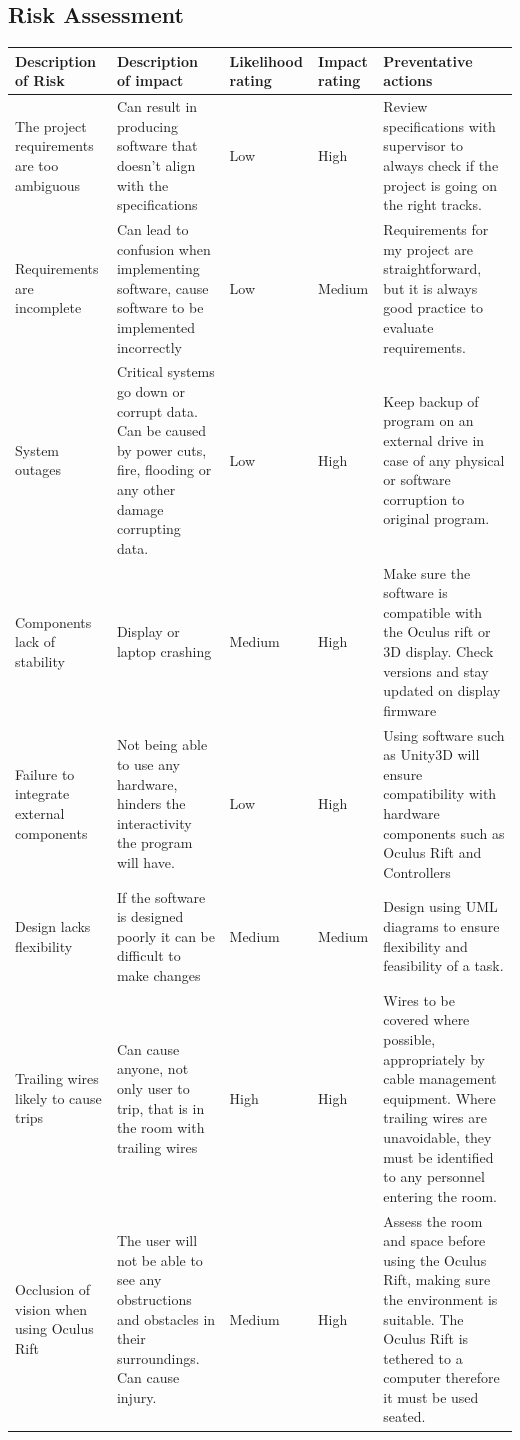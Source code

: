 \documentclass[12pt]{article} %
\begin{document}
\begin{flushleft}
\subsection{Risk Assessment}
\begin{supertabular}{ p{2.5cm}>{\arraybackslash}p{3.75cm} p{1.75cm} p{1.75cm} p{5cm} }
\hline
Description of Risk & Description of impact  & Likelihood rating & Impact rating & Preventative actions  \\ \midrule
The project requirements are too ambiguous & Can result in producing software that doesn’t align with the specifications & Low & High & Review specifications with supervisor to always check if the project is going on the right tracks.\\ \midrule
Requirements are incomplete & Can lead to confusion when implementing software, cause software to be implemented incorrectly  & Low & Medium & Requirements for my project are straightforward, but it is always good practice to evaluate requirements. \\  \midrule
System outages & Critical systems go down or corrupt data. Can be caused by power cuts, fire, flooding or any other damage corrupting data.& Low & High & Keep backup of program on an external drive in case of any physical or software corruption to original program. \\ \midrule
Components lack of stability & Display or laptop crashing & Medium & High & Make sure the software is compatible with the Oculus rift or 3D display. Check versions and stay updated on display firmware \\ \midrule
Failure to integrate external components & Not being able to use any hardware, hinders the interactivity the program will have. & Low & High & Using software such as Unity3D will ensure compatibility with hardware components such as Oculus Rift and Controllers \\  \midrule
Design lacks flexibility & If the software is designed poorly it can be difficult to make changes & Medium & Medium & Design using UML diagrams to ensure flexibility and feasibility of a task. \\ \midrule
Trailing wires likely to cause trips & Can cause anyone, not only user to trip, that is in the room with trailing wires & High & High & Wires to be covered where possible, appropriately by cable management equipment. Where trailing wires are unavoidable, they must be identified to any personnel entering the room. \\  \midrule
Occlusion of vision when using Oculus Rift & The user will not be able to see any obstructions and obstacles in their surroundings. Can cause injury. & Medium & High & Assess the room and space before using the Oculus Rift, making sure the environment is suitable. The Oculus Rift is tethered to a computer therefore it must be used seated. \\ \midrule

\end{supertabular}
\end{flushleft}
\end{document}
